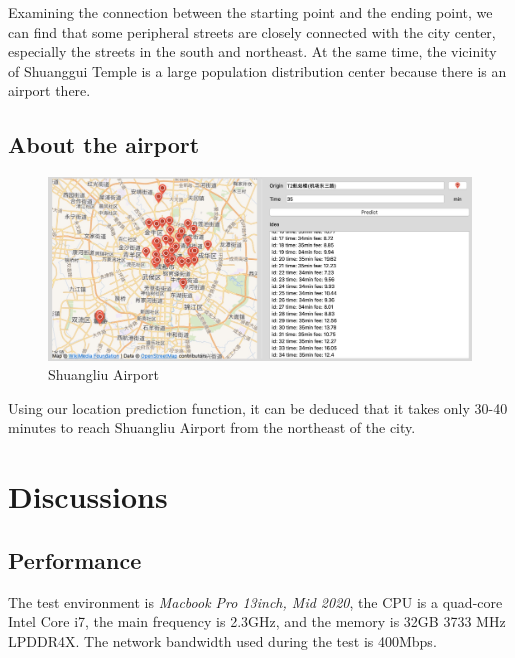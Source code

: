 \documentclass{article}
\begin{document}
Examining the connection between the starting point and the ending point, we can find that some peripheral streets are closely connected with the city center, especially the streets in the south and northeast. At the same time, the vicinity of Shuanggui Temple is a large population distribution center because there is an airport there.

\subsection{About the airport}
\setlength{\parindent}{0em}
\begin{figure}[htbp] 
	\centering 
	\includegraphics[scale=0.14]{realPlane.jpg}
	\caption{Shuangliu Airport}
\end{figure}
\setlength{\parindent}{2em}
Using our location prediction function, it can be deduced that it takes only 30-40 minutes to reach Shuangliu Airport from the northeast of the city.
\section{Discussions}
\subsection{Performance}
The test environment is \emph{Macbook Pro 13inch, Mid 2020}, the CPU is a quad-core Intel Core i7, the main frequency is 2.3GHz, and the memory is 32GB 3733 MHz LPDDR4X. The network bandwidth used during the test is 400Mbps. 
\end{document}
